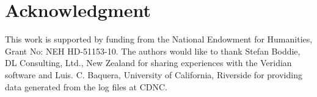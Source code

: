 \documentclass{sig-alternate}
\begin{document}
\section*{Acknowledgment}
This work is supported by funding from the National Endowment for Humanities, Grant No: NEH HD-51153-10. The authors would like to thank Stefan Boddie, DL Consulting, Ltd., New Zealand for sharing experiences with the Veridian software and Luis. C. Baquera, University of California, Riverside for providing data generated from the log files at CDNC.\\

%
%
%




\end{document}
